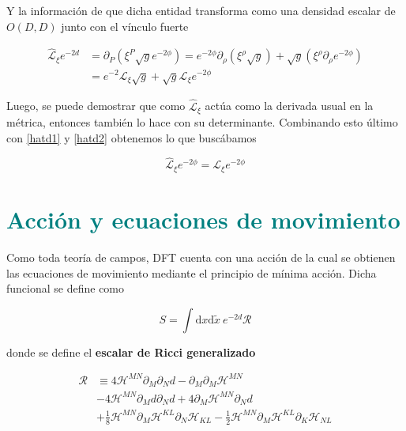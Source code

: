 \documentclass{article}
\numberwithin{equation}{section}
\begin{document}
Y la información de que dicha entidad transforma como una densidad escalar de $ O(D,D) $ junto con el vínculo fuerte

\begin{equation}\label{hatd2}
\begin{aligned}
\hat{\mathcal{L}}_{\xi} e^{-2d} &= \partial_P \left( \xi^P\sqrt{g}e^{-2\phi}\right) = e^{-2\phi} \partial_{\rho} \left(\xi^{\rho}\sqrt{g}\right) + \sqrt{g} \left(\xi^{\rho}\partial_{\rho}e^{-2\phi}\right)\\
&= e^{-2} \mathcal{L}_{\xi}\sqrt{g} + \sqrt{g} \mathcal{L}_{\xi}e^{-2\phi}
\end{aligned}
\end{equation}

Luego, se puede demostrar que como $ \hat{\mathcal{L}}_{\xi} $ actúa como la derivada usual en la métrica, entonces también lo hace con su determinante. Combinando esto último con \ref{hatd1} y \ref{hatd2} obtenemos lo que buscábamos

\begin{equation}\label{key}
\hat{\mathcal{L}}_{\xi} e^{-2\phi} = \mathcal{L}_{\xi} e^{-2\phi}
\end{equation}

\section{\textcolor{teal}{Acción y ecuaciones de movimiento}}

Como toda teoría de campos, DFT cuenta con una acción de la cual se obtienen las ecuaciones de movimiento mediante el principio de mínima acción. Dicha funcional se define como

\begin{equation}\label{S}
S = \int \mathrm{d}x\mathrm{d}\widetilde{x} \ e^{-2d} \mathcal{R}
\end{equation}

donde se define el \textbf{escalar de Ricci generalizado}

\begin{equation}\label{Rhat}
\begin{aligned}
\mathcal{R} &\equiv 4\mathcal{H}^{MN}\partial_M\partial_N d - \partial_M\partial_M\mathcal{H}^{MN}\\
& - 4\mathcal{H}^{MN}\partial_M d\partial_N d + 4\partial_M\mathcal{H}^{MN}\partial_N d\\
& + \frac{1}{8} \mathcal{H}^{MN}\partial_M \mathcal{H}^{KL}\partial_N \mathcal{H}_{KL} - \frac{1}{2} \mathcal{H}^{MN}\partial_M \mathcal{H}^{KL}\partial_K \mathcal{H}_{NL}
\end{aligned}
\end{equation} 
\end{document}
